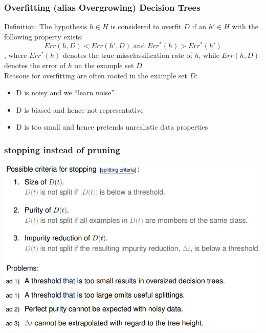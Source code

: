 \documentclass[11pt,a4paper]{article}
\begin{document}
\begin{flushleft}
\subsubsection{Overfitting (alias Overgrowing) Decision Trees}
Definition: The hypothesis $h \in H$ is considered to overfit $D$ if an $h' \in H$ with the following property exists:
$$ Err(h, D) < Err(h', D) \text{ and } Err^*(h) > Err^* (h') $$,
where $Err^*(h)$ denotes the true missclassification rate of $h$, while $Err(h, D)$ denotes the error of $h$ on the example set $D$. \\
Reasons for overfitting are often rooted in the example set $D$:
\begin{itemize}
 \item D is noisy and we “learn noise”
 \item D is biased and hence not representative
 \item D is too small and hence pretends unrealistic data properties
\end{itemize}
\subsubsection{stopping instead of pruning}
\includegraphics[width = \textwidth]{stopping}

\end{flushleft}
\end{document}
